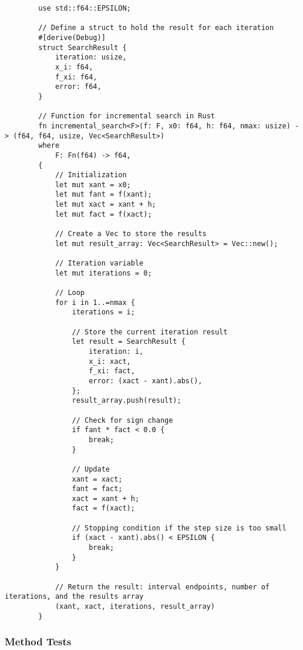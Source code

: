 \documentclass{article}
\begin{document}
    \begin{verbatim}
        use std::f64::EPSILON;

        // Define a struct to hold the result for each iteration
        #[derive(Debug)]
        struct SearchResult {
            iteration: usize,
            x_i: f64,
            f_xi: f64,
            error: f64,
        }

        // Function for incremental search in Rust
        fn incremental_search<F>(f: F, x0: f64, h: f64, nmax: usize) -> (f64, f64, usize, Vec<SearchResult>)
        where
            F: Fn(f64) -> f64,
        {
            // Initialization
            let mut xant = x0;
            let mut fant = f(xant);
            let mut xact = xant + h;
            let mut fact = f(xact);

            // Create a Vec to store the results
            let mut result_array: Vec<SearchResult> = Vec::new();

            // Iteration variable
            let mut iterations = 0;

            // Loop
            for i in 1..=nmax {
                iterations = i;

                // Store the current iteration result
                let result = SearchResult {
                    iteration: i,
                    x_i: xact,
                    f_xi: fact,
                    error: (xact - xant).abs(),
                };
                result_array.push(result);

                // Check for sign change
                if fant * fact < 0.0 {
                    break;
                }

                // Update
                xant = xact;
                fant = fact;
                xact = xant + h;
                fact = f(xact);

                // Stopping condition if the step size is too small
                if (xact - xant).abs() < EPSILON {
                    break;
                }
            }

            // Return the result: interval endpoints, number of iterations, and the results array
            (xant, xact, iterations, result_array)
        }
    \end{verbatim}

    \subsubsection{Method Tests}\label{subsec:method-tests}
\end{document}
